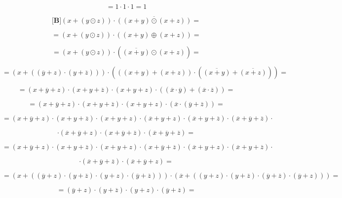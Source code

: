 \documentclass[
]{article}
\begin{document}
\begin{enumerate}
\begin{enumerate}
\begin{enumerate}
\begin{enumerate}
        \[{= {{1 \cdot 1} \cdot 1}} = 1\]

        \[{\lbrack\mathbf{B}\rbrack}{{{({x + {({y \odot z})}})} \cdot \overline{({{({x+y})}\odot{({x+z})}})}} =}\]

        \[{= {{({x + {({y \odot z})}})} \cdot {({{({x + y})} \oplus {({x + z})}})}}} =\]

        \[{= {{({x + {({y \odot z})}})} \cdot {({\overline{({x+y})} \odot {({x + z})}})}}} =\]

        \[{= {{({x + {({{({\overline{y} + z})} \cdot {({y + \overline{z}})}})}})} \cdot {({{({{({x + y})} + {({x + z})}})} \cdot {({\overline{({x+y})} + \overline{({x+z})}})}})}}} =\]

        \[{= {{{{({{x + \overline{y}} + z})} \cdot {({{x + y} + \overline{z}})}} \cdot {({{x + y} + z})}} \cdot \left( {\left( {\overline{x} \cdot \overline{y}} \right) + \left( {\overline{x} \cdot \overline{z}} \right)} \right)}} =\]

        \[{= {{{{({{x + \overline{y}} + z})} \cdot {({{x + y} + \overline{z}})}} \cdot {({{x + y} + z})}} \cdot {({\overline{x} \cdot {({\overline{y} + \overline{z}})}})}}} =\]

        \[= {{{{{{{({{x + \overline{y}} + z})} \cdot {({{x + y} + \overline{z}})}} \cdot {({{x + y} + z})}} \cdot {({{\overline{x} + y} + z})}} \cdot {({{\overline{x} + y} + \overline{z}})}} \cdot {({{\overline{x} + \overline{y}} + \overline{z}})}} \cdot}\]

        \[{{{\cdot {({{\overline{x} + \overline{y}} + z})}} \cdot {({{x + \overline{y}} + \overline{z}})}} \cdot {({{\overline{x} + \overline{y}} + \overline{z}})}} =\]

        \[= {{{{{{{({{x + \overline{y}} + z})} \cdot {({{x + y} + \overline{z}})}} \cdot {({{x + y} + z})}} \cdot {({{x + \overline{y}} + \overline{z}})}} \cdot {({{\overline{x} + y} + z})}} \cdot {({{\overline{x} + y} + \overline{z}})}} \cdot}\]

        \[{{\cdot {({{\overline{x} + \overline{y}} + \overline{z}})}} \cdot {({{\overline{x} + \overline{y}} + z})}} =\]

        \[{= {{({x + {({{{{({\overline{y} + z})} \cdot {({y + \overline{z}})}} \cdot {({y + z})}} \cdot {({\overline{y} + \overline{z}})}})}})} \cdot {({\overline{x} + {({{{{({y + z})} \cdot {({y + \overline{z}})}} \cdot {({\overline{y} + \overline{z}})}} \cdot {({\overline{y} + z})}})}})}}} =\]

        \[{= {{{{({\overline{y} + z})} \cdot {({y + \overline{z}})}} \cdot {({y + z})}} \cdot {({\overline{y} + \overline{z}})}}} =\]


\end{enumerate}
\end{enumerate}
\end{enumerate}
\end{enumerate}
\end{document}
